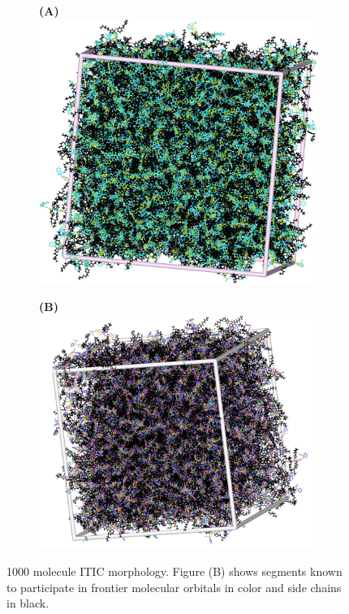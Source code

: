 \begin{figure}[]
\centering
\begin{subfigure}{.5\textwidth}
    \textbf{(A)}
    \includegraphics[width=\textwidth]{figures/ITIC-blackedout-unwrapped-allatom.png}
\end{subfigure}%
\begin{subfigure}{.5\textwidth}
    \textbf{(B)}
    \includegraphics[width=\textwidth]{figures/ITIC-blackedout-unwrapped.png}
\end{subfigure}
    \caption[short]{1000 molecule ITIC morphology. Figure (B) shows segments known to participate in frontier
    molecular orbitals in color and side chains in black.}
\label{ITIC}
\end{figure}



